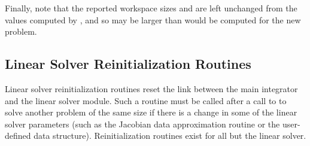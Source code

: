 Finally, note that the reported workspace sizes \id{[LENRW]} 
and \id{[LENIW]} are left unchanged from the values computed 
by , and so may be larger than would be computed for 
the new problem.

\subsection{Linear Solver Reinitialization Routines}\label{sss:lin_solv_reinit}

Linear solver reinitialization routines reset the link between the main {\cvodes}
integrator and the linear solver module. Such a routine must be called after a call
to  to solve another problem of the same size if there is a change
in some of the linear solver parameters (such as the Jacobian data approximation
routine or the user-defined data structure). Reinitialization routines exist for
all but the {\cvdiag} linear solver.

